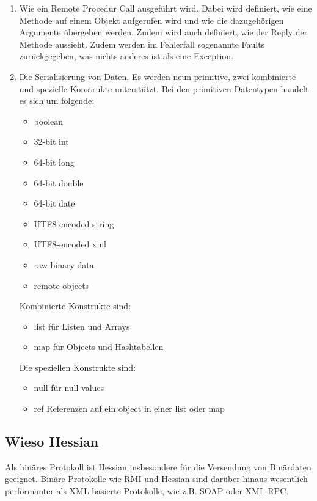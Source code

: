 \documentclass[abstracton, listof=totocnumbered,
bibliography=totocnumbered]{scrreprt}
\begin{document}
  \begin{enumerate}
    \item Wie ein Remote Procedur Call ausgeführt wird. Dabei wird
    definiert, wie eine Methode auf einem Objekt aufgerufen wird und wie die
    dazugehörigen Argumente übergeben werden. Zudem wird auch definiert, wie der
    Reply der Methode aussieht. Zudem werden im Fehlerfall sogenannte Faults
    zurückgegeben, was nichts anderes ist als eine Exception.
    \item Die Serialisierung von Daten. Es werden neun primitive, zwei
    kombinierte und spezielle Konstrukte unterstützt. Bei den primitiven
    Datentypen handelt es sich um folgende:
    \begin{itemize}
      \item boolean
      \item 32-bit int
      \item 64-bit long
      \item 64-bit double
      \item 64-bit date
      \item UTF8-encoded string
      \item UTF8-encoded xml
      \item raw binary data
      \item remote objects
    \end{itemize}
    Kombinierte Konstrukte sind:
    \begin{itemize}
      \item list für Listen und Arrays
      \item map für Objects und Hashtabellen
    \end{itemize}
    Die speziellen Konstrukte sind:
    \begin{itemize}
      \item null für null values
      \item ref Referenzen auf ein object in einer list oder map
    \end{itemize}
  \end{enumerate}
  
  \subsection{Wieso Hessian}
  
  Als binäres Protokoll ist Hessian insbesondere für die Versendung von
  Binärdaten geeignet. Binäre Protokolle wie RMI und Hessian sind darüber
  hinaus wesentlich performanter als XML basierte Protokolle, wie z.B. \ac{SOAP}
  oder XML-RPC.
\end{document}
